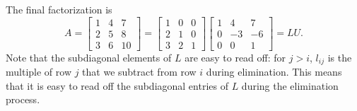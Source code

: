 \documentclass[12pt, leqno]{article} %
\begin{document}
The final factorization is
\[
A =
\begin{bmatrix} 1 & 4 & 7 \\ 2 & 5 & 8 \\ 3 & 6 & 10 \end{bmatrix} =
\begin{bmatrix} 1 & 0 & 0 \\ 2 & 1 & 0 \\ 3 & 2 & 1 \end{bmatrix}
\begin{bmatrix} 1 & 4 & 7 \\ 0 & -3 & -6 \\ 0 & 0 & 1 \end{bmatrix} = LU.
\]
Note that the subdiagonal elements of $L$ are easy to read off: for $j
> i$, $l_{ij}$ is the multiple of row $j$ that we subtract from row
$i$ during elimination.  This means that it is easy to read off the
subdiagonal entries of $L$ during the elimination process.



\end{document}

